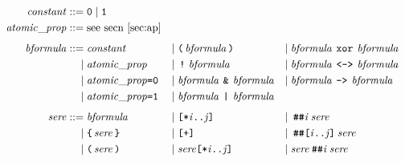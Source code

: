 \documentclass[a4paper,twoside,10pt,DIV=12]{scrreprt}
\DeclareMathOperator{\NOT}{\texttt{!}}
\newcommand{\XOR}{\mathbin{\texttt{xor}}}
\newcommand{\IMPLIES}{\mathbin{\texttt{->}}}
\newcommand{\EQUIV}{\mathbin{\texttt{<->}}}
\newcommand{\OR}{\mathbin{\texttt{|}}}
\newcommand{\AND}{\mathbin{\texttt{\&}}}
\newcommand{\DELAY}[1]{\mathbin{\texttt{\#\##1}}}
\newcommand{\DELAYR}[1]{\mathbin{\texttt{\#\#[#1]}}}
\newcommand{\0}{\texttt{0}}
\newcommand{\1}{\texttt{1}}
\newcommand{\STAR}[1]{\texttt{[*#1]}}
\newcommand{\PLUS}{\texttt{[+]}}
\newcommand\mvar[1]{\ensuremath{\mathit{#1}}}
\newcommand\code[1]{\texttt{#1}}
\newcommand\tsamp[1]{\text{\texttt{#1}}}
\newcommand\msamp[1]{#1}
\begin{document}
\begin{align*}
\mathit{constant} ::={}     & \0 \mid \1                                                                                                                                                                                                       \\
\mathit{atomic\_prop} ::={} & \text{see secn~\ref{sec:ap}}                                                                                                                                                                                     \\[1ex]
  \mathit{bformula} ::={}   & \mathit{constant}                                      & \mid{} & \tsamp{(}\,\mathit{bformula}\,\tsamp{)}                    & \mid{} & \mathit{bformula}\,\msamp{\XOR}\,\mathit{bformula}                       \\
  \mid{}                    & \mathit{atomic\_prop}                                  & \mid{} & \msamp{\NOT}\,\mathit{bformula}                            & \mid{} & \mathit{bformula}\,\msamp{\EQUIV}\,\mathit{bformula}                     \\
  \mid{}                    & \mathit{atomic\_prop}\code{=0}                         & \mid{} & \mathit{bformula}\,\msamp{\AND}\,\mathit{bformula}         & \mid{} & \mathit{bformula}\,\msamp{\IMPLIES}\,\mathit{bformula}                   \\
  \mid{}                    & \mathit{atomic\_prop}\code{=1}                         & \mid{} & \mathit{bformula}\,\msamp{\OR}\,\mathit{bformula}                                                                                              \\[1ex]
\mathit{sere} ::={}         & \mathit{bformula}                                      & \mid{} & \msamp{\STAR{\mvar{i}..\mvar{j}}}                          & \mid{} & \DELAY{\mvar{i}}\mathit{sere}                                            \\
  \mid{}                    & \tsamp{\{}\,\mathit{sere}\,\tsamp{\}}                  & \mid{} & \msamp{\PLUS{}}                                            & \mid{} & \DELAYR{\mvar{i}..\mvar{j}}\mathit{sere}                                 \\
  \mid{}                    & \tsamp{(}\,\mathit{sere}\,\tsamp{)}                    & \mid{} & \mathit{sere}\msamp{\STAR{\mvar{i}..\mvar{j}}}             & \mid{} & \mathit{sere}\DELAY{\mvar{i}}\mathit{sere}                               \\

\end{align*}
\end{document}
